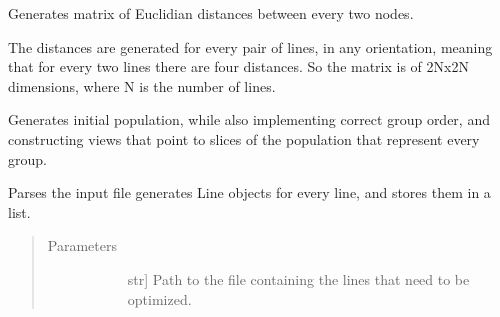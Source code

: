 \documentclass[letterpaper,10pt,english,openany,oneside]{sphinxmanual}
\begin{document}
\begin{fulllineitems}
\begin{fulllineitems}
\label{\detokenize{reference:cnc.optimization.CNCOptimizer.generate_distance_matrix}}
Generates matrix of Euclidian distances between every two nodes.

The distances are generated for every pair of lines, in any
orientation, meaning that for every two lines there are four distances.
So the matrix is of 2Nx2N dimensions, where N is the number of lines.

\end{fulllineitems}


\begin{fulllineitems}
\label{\detokenize{reference:cnc.optimization.CNCOptimizer.generate_initial_population}}
Generates initial population, while also implementing correct group
order, and constructing views that point to slices of the population
that represent every group.

\end{fulllineitems}


\begin{fulllineitems}
\label{\detokenize{reference:cnc.optimization.CNCOptimizer.generate_lines_from_file}}
Parses the input file generates Line objects for every line, and stores
them in a list.
\begin{quote}\begin{description}
\item[{Parameters}] \leavevmode\begin{description}
\item[{}] \leavevmode{[}str{]}
Path to the file containing the lines that need to be optimized.

\end{description}

\end{description}\end{quote}


\end{fulllineitems}
\end{fulllineitems}
\end{document}
